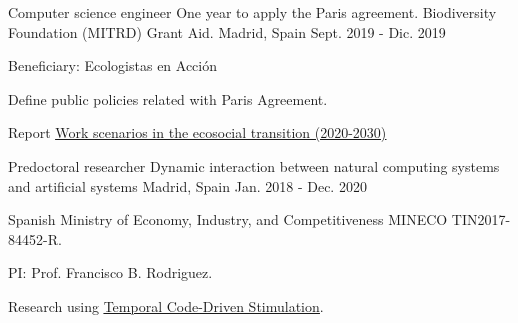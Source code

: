 \begin{cventries}
  \cventry %
    {Computer science engineer} %
    {One year to apply the Paris agreement. Biodiversity Foundation (MITRD) Grant Aid.} %
    {Madrid, Spain} %
    {Sept. 2019 - Dic. 2019} %
    {
      \begin{cvitems} %
        \item {Beneficiary: Ecologistas en Acción}
        \item {Define public policies related with Paris Agreement.}
        \item {Report \underline{\href{https://www.ecologistasenaccion.org/132893/informe-escenarios-de-trabajo-en-la-transicion-ecosocial-2020-2030/}{Work scenarios in the ecosocial transition (2020-2030)}} }
      \end{cvitems}
    }

  \cventry
    {Predoctoral researcher} %
    {Dynamic interaction between natural computing systems and artificial systems} %
    {Madrid, Spain} %
    {Jan. 2018 - Dec. 2020} %
    {
      \begin{cvitems} %
        \item {Spanish Ministry of Economy, Industry, and Competitiveness MINECO TIN2017-84452-R.}
        \item {PI: Prof. Francisco B. Rodriguez.}
        \item {Research using \underline{\href{https://github.com/GNB-UAM/tcds-adclamp}{Temporal Code-Driven Stimulation}}.}
      \end{cvitems}
    }
    



\end{cventries}
